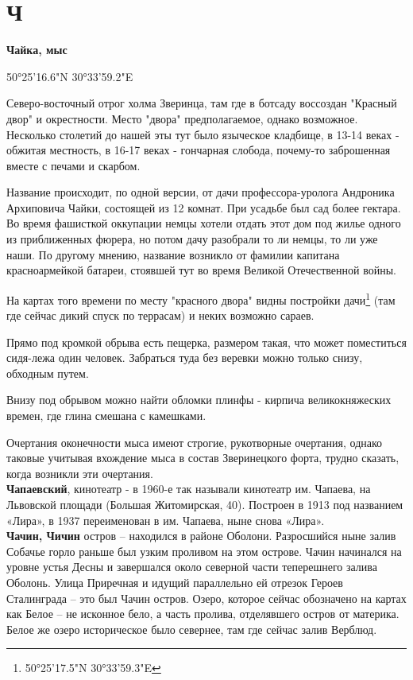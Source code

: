 \chapter*{Ч}

\textbf{Чайка, мыс}

50°25'16.6"N 30°33'59.2"E

Северо-восточный отрог холма Зверинца, там где в ботсаду воссоздан "Красный двор" и окрестности. Место "двора" предполагаемое, однако возможное. Несколько столетий до нашей эты тут было языческое кладбище, в 13-14 веках - обжитая местность, в 16-17 веках - гончарная слобода, почему-то заброшенная вместе с печами и скарбом.

Название происходит, по одной версии, от дачи профессора-уролога Андроника Архиповича Чайки, состоящей из 12 комнат. При усадьбе был сад более гектара. Во время фашисткой оккупации немцы хотели отдать этот дом под жилье одного из приближенных фюрера, но потом дачу разобрали то ли немцы, то ли уже наши. По другому мнению, название возникло от фамилии капитана красноармейкой батареи, стоявшей тут во время Великой Отечественной войны.

На картах того времени по месту "красного двора" видны постройки дачи\footnote{50°25'17.5"N 30°33'59.3"E} (там где сейчас дикий спуск по террасам) и неких возможно сараев. 

Прямо под кромкой обрыва есть пещерка, размером такая, что может поместиться сидя-лежа один человек. Забраться туда без веревки можно только снизу, обходным путем.

Внизу под обрывом можно найти обломки плинфы - кирпича великокняжеских времен, где глина смешана с камешками.

Очертания оконечности мыса имеют строгие, рукотворные очертания, однако таковые учитывая вхождение мыса в состав Зверинецкого форта, трудно сказать, когда возникли эти очертания.\\ 


\textbf{Чапаевский}, кинотеатр - в 1960-е так называли кинотеатр им. Чапаева, на Львовской площади (Большая Житомирская, 40). Построен в 1913 под названием «Лира», в 1937 переименован в им. Чапаева, ныне снова «Лира».\\

\textbf{Чачин, Чичин} остров – находился в районе Оболони. Разросшийся ныне залив Собачье горло раньше был узким проливом на этом острове. Чачин начинался на уровне устья Десны и завершался около северной части теперешнего залива Оболонь. Улица Приречная и идущий параллельно ей отрезок Героев Сталинграда – это был Чачин остров. Озеро, которое сейчас обозначено на картах как Белое – не исконное бело, а часть пролива, отделявшего остров от материка. Белое же озеро историческое было севернее, там где сейчас залив Верблюд.\\

